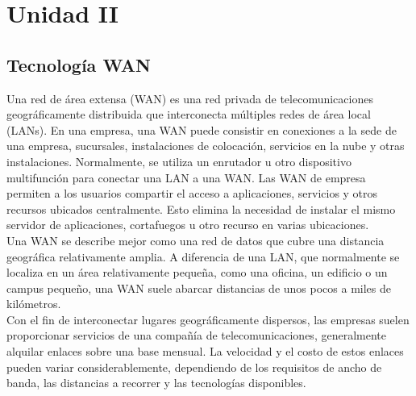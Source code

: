 \documentclass[
	12pt, %
	fleqn, %
	a4paper, %
	oneside, %
]{LegrandOrangeBook}
\begin{document}
\chapter{Unidad II}
\section{Tecnología WAN}
Una red de área extensa (WAN) es una red privada de telecomunicaciones geográficamente distribuida que interconecta múltiples redes de área local (LANs). En una empresa, una WAN puede consistir en conexiones a la sede de una empresa, sucursales, instalaciones de colocación, servicios en la nube y otras instalaciones. Normalmente, se utiliza un enrutador u otro dispositivo multifunción para conectar una LAN a una WAN. Las WAN de empresa permiten a los usuarios compartir el acceso a aplicaciones, servicios y otros recursos ubicados centralmente. Esto elimina la necesidad de instalar el mismo servidor de aplicaciones, cortafuegos u otro recurso en varias ubicaciones.\\
Una WAN se describe mejor como una red de datos que cubre una distancia geográfica relativamente amplia. A diferencia de una LAN, que normalmente se localiza en un área relativamente pequeña, como una oficina, un edificio o un campus pequeño, una WAN suele abarcar distancias de unos pocos a miles de kilómetros.\\
Con el fin de interconectar lugares geográficamente dispersos, las empresas suelen proporcionar servicios de una compañía de telecomunicaciones, generalmente alquilar enlaces sobre una base mensual. La velocidad y el costo de estos enlaces pueden variar considerablemente, dependiendo de los requisitos de ancho de banda, las distancias a recorrer y las tecnologías disponibles.
\end{document}
